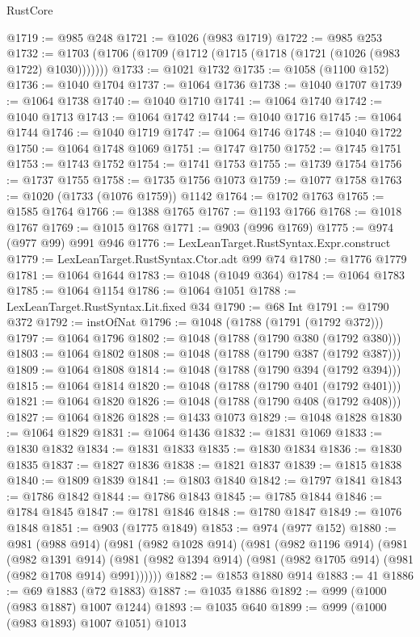 \begin{lexlean}{RustCore}
\begin{coremodule}
@1719 := @985 @248
@1721 := @1026 (@983 @1719)
@1722 := @985 @253
@1732 := @1703 (@1706 (@1709 (@1712 (@1715 (@1718 (@1721 (@1026 (@983 @1722) @1030)))))))
@1733 := @1021 @1732
@1735 := @1058 (@1100 @152)
@1736 := @1040 @1704
@1737 := @1064 @1736
@1738 := @1040 @1707
@1739 := @1064 @1738
@1740 := @1040 @1710
@1741 := @1064 @1740
@1742 := @1040 @1713
@1743 := @1064 @1742
@1744 := @1040 @1716
@1745 := @1064 @1744
@1746 := @1040 @1719
@1747 := @1064 @1746
@1748 := @1040 @1722
@1750 := @1064 @1748 @1069
@1751 := @1747 @1750
@1752 := @1745 @1751
@1753 := @1743 @1752
@1754 := @1741 @1753
@1755 := @1739 @1754
@1756 := @1737 @1755
@1758 := @1735 @1756 @1073
@1759 := @1077 @1758
@1763 := @1020 (@1733 (@1076 @1759)) @1142
@1764 := @1702 @1763
@1765 := @1585 @1764
@1766 := @1388 @1765
@1767 := @1193 @1766
@1768 := @1018 @1767
@1769 := @1015 @1768
@1771 := @903 (@996 @1769)
@1775 := @974 (@977 @99) @991 @946
@1776 := LexLeanTarget.RustSyntax.Expr.construct
@1779 := LexLeanTarget.RustSyntax.Ctor.adt @99 @74
@1780 := @1776 @1779
@1781 := @1064 @1644
@1783 := @1048 (@1049 @364)
@1784 := @1064 @1783
@1785 := @1064 @1154
@1786 := @1064 @1051
@1788 := LexLeanTarget.RustSyntax.Lit.fixed @34
@1790 := @68 Int
@1791 := @1790 @372
@1792 := instOfNat
@1796 := @1048 (@1788 (@1791 (@1792 @372)))
@1797 := @1064 @1796
@1802 := @1048 (@1788 (@1790 @380 (@1792 @380)))
@1803 := @1064 @1802
@1808 := @1048 (@1788 (@1790 @387 (@1792 @387)))
@1809 := @1064 @1808
@1814 := @1048 (@1788 (@1790 @394 (@1792 @394)))
@1815 := @1064 @1814
@1820 := @1048 (@1788 (@1790 @401 (@1792 @401)))
@1821 := @1064 @1820
@1826 := @1048 (@1788 (@1790 @408 (@1792 @408)))
@1827 := @1064 @1826
@1828 := @1433 @1073
@1829 := @1048 @1828
@1830 := @1064 @1829
@1831 := @1064 @1436
@1832 := @1831 @1069
@1833 := @1830 @1832
@1834 := @1831 @1833
@1835 := @1830 @1834
@1836 := @1830 @1835
@1837 := @1827 @1836
@1838 := @1821 @1837
@1839 := @1815 @1838
@1840 := @1809 @1839
@1841 := @1803 @1840
@1842 := @1797 @1841
@1843 := @1786 @1842
@1844 := @1786 @1843
@1845 := @1785 @1844
@1846 := @1784 @1845
@1847 := @1781 @1846
@1848 := @1780 @1847
@1849 := @1076 @1848
@1851 := @903 (@1775 @1849)
@1853 := @974 (@977 @152)
@1880 := @981
    (@988 @914)
    (@981
      (@982 @1028 @914)
      (@981
        (@982 @1196 @914)
        (@981
          (@982 @1391 @914)
          (@981 (@982 @1394 @914) (@981 (@982 @1705 @914) (@981 (@982 @1708 @914) @991))))))
@1882 := @1853 @1880 @914
@1883 := 41
@1886 := @69 @1883 (@72 @1883)
@1887 := @1035 @1886
@1892 := @999 (@1000 (@983 @1887) @1007 @1244)
@1893 := @1035 @640
@1899 := @999 (@1000 (@983 @1893) @1007 @1051) @1013

\end{coremodule}
\end{lexlean}
